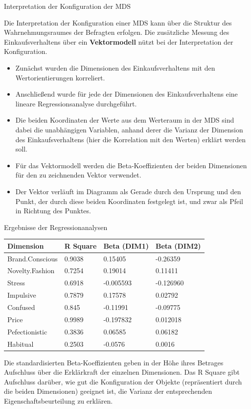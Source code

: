 \documentclass[12pt,ngerman,a4paper,ignorenonframetext,]{beamer}
\providecommand{\tightlist}{%
  \setlength{\itemsep}{0pt}\setlength{\parskip}{0pt}}
\begin{document}
\begin{frame}{Interpretation der Konfiguration der MDS}
\protect\hypertarget{interpretation-der-konfiguration-der-mds}{}

Die Interpretation der Konfiguration einer MDS kann über die Struktur
des Wahrnehmungsraumes der Befragten erfolgen. Die zusätzliche Messung
des Einkaufsverhaltens über ein \textbf{Vektormodell} nützt bei der
Interpretation der Konfiguration.

\begin{itemize}
\tightlist
\item
  Zunächst wurden die Dimensionen des Einkaufsverhaltens mit den
  Wertorientierungen korreliert.
\item
  Anschließend wurde für jede der Dimensionen des Einkaufsverhaltens
  eine lineare Regressionsanalyse durchgeführt.
\item
  Die beiden Koordinaten der Werte aus dem Werteraum in der MDS sind
  dabei die unabhängigen Variablen, anhand derer die Varianz der
  Dimension des Einkaufsverhaltens (hier die Korrelation mit den Werten)
  erklärt werden soll.
\item
  Für das Vektormodell werden die Beta-Koeffizienten der beiden
  Dimensionen für den zu zeichnenden Vektor verwendet.
\item
  Der Vektor verläuft im Diagramm als Gerade durch den Ursprung und den
  Punkt, der durch diese beiden Koordinaten festgelegt ist, und zwar als
  Pfeil in Richtung des Punktes.
\end{itemize}

\end{frame}

\begin{frame}{Ergebnisse der Regressionanalysen}
\protect\hypertarget{ergebnisse-der-regressionanalysen}{}

\begin{longtable}[]{@{}llll@{}}
\toprule
Dimension & R Square & Beta (DIM1) & Beta (DIM2)\tabularnewline
\midrule
\endhead
Brand.Conscious & 0.9038 & 0.15405 & -0.26359\tabularnewline
Novelty.Fashion & 0.7254 & 0.19014 & 0.11411\tabularnewline
Stress & 0.6918 & -0.005593 & -0.126960\tabularnewline
Impulsive & 0.7879 & 0.17578 & 0.02792\tabularnewline
Confused & 0.845 & -0.11991 & -0.09775\tabularnewline
Price & 0.9989 & -0.197832 & 0.012018\tabularnewline
Pefectionistic & 0.3836 & 0.06585 & 0.06182\tabularnewline
Habitual & 0.2503 & -0.0576 & 0.0016\tabularnewline
\bottomrule
\end{longtable}

Die standardisierten Beta-Koeffizienten geben in der Höhe ihres Betrages
Aufschluss über die Erklärkraft der einzelnen Dimensionen. Das R Square
gibt Aufschluss darüber, wie gut die Konfiguration der Objekte
(repräsentiert durch die beiden Dimensionen) geeignet ist, die Varianz
der entsprechenden Eigenschaftsbeurteilung zu erklären.

\end{frame}
\end{document}
